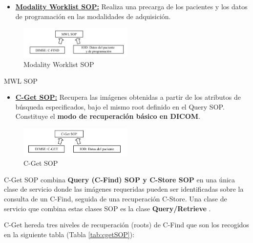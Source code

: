 \begin{itemize}
\item \textbf{\underline{Modality Worklist SOP:}} Realiza una precarga de los pacientes y los datos de programación en las modalidades de adquisición.
\end{itemize}

\begin{figure}[!h]
\begin{center}
\includegraphics[width=0.5\textwidth]{images/MWSOP.png}
\caption{Modality Worklist SOP}
\label{fig:MWSOP}
\end{center}
\end{figure}

\begin{table}[hp]
\centering{
\small
}
\caption{MWL SOP}
\label{tab:MWSOP}
\end{table}

\begin{itemize}
\item \textbf{\underline{C-Get SOP:}} Recupera las imágenes obtenidas a partir de los atributos de búsqueda especificados, bajo el mismo root definido en el Query SOP. Constituye el \textbf{modo de recuperación básico en \acs{DICOM}}.
\end{itemize}

\begin{figure}[!h]
\begin{center}
\includegraphics[width=0.5\textwidth]{images/cgetSOP.png}
\caption{C-Get SOP}
\label{fig:cgetSOP}
\end{center}
\end{figure}

C-Get SOP combina \textbf{Query (C-Find) SOP y C-Store SOP} en una única clase de servicio donde las imágenes requeridas pueden ser identificadas sobre la consulta de un C-Find, seguida de una recuperación C-Store. Una clase de servicio que combina estas clases SOP es la clase \textbf{Query/Retrieve} \cite{15}. 

C-Get hereda tres niveles de recuperación (roots) de C-Find que son los recogidos en la siguiente tabla (Tabla \ref{tab:cgetSOP}):

